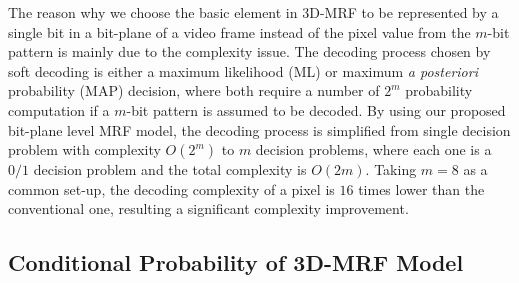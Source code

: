 \documentclass[10pt,twocolumn,twoside]{IEEEtran}
\begin{document}
The reason why we choose the basic element in 3D-MRF to be represented by a single bit in a bit-plane of a video frame instead of the pixel value from the $m$-bit pattern is mainly due to the complexity issue.  The decoding process chosen by soft decoding is either a maximum likelihood (ML) or maximum \textit{a posteriori} probability (MAP) decision, where both require a number of $2^m$ probability computation if a $m$-bit pattern is assumed to be decoded. By using our proposed bit-plane level MRF model, the decoding process is simplified from single decision problem with complexity $O(2^m)$ to $m$ decision problems, where each one is a $0/1$ decision problem and the total complexity is $O(2m)$. Taking $m=8$ as a common set-up, the decoding complexity of a pixel is $16$ times lower than the conventional one, resulting a significant complexity improvement.

\subsection{Conditional Probability of 3D-MRF Model}
\end{document}
